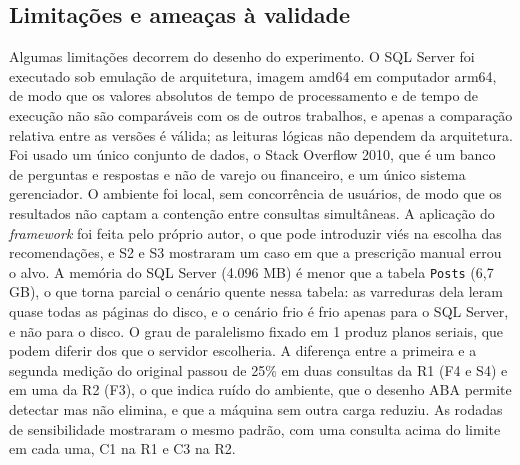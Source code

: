 \subsection{Limitações e ameaças à validade}\label{sec:limitacoes}

Algumas limitações decorrem do desenho do experimento. O SQL Server foi executado sob emulação de arquitetura, imagem amd64 em computador arm64, de modo que os valores absolutos de tempo de processamento e de tempo de execução não são comparáveis com os de outros trabalhos, e apenas a comparação relativa entre as versões é válida; as leituras lógicas não dependem da arquitetura. Foi usado um único conjunto de dados, o Stack Overflow 2010, que é um banco de perguntas e respostas e não de varejo ou financeiro, e um único sistema gerenciador. O ambiente foi local, sem concorrência de usuários, de modo que os resultados não captam a contenção entre consultas simultâneas. A aplicação do \textit{framework} foi feita pelo próprio autor, o que pode introduzir viés na escolha das recomendações, e S2 e S3 mostraram um caso em que a prescrição manual errou o alvo. A memória do SQL Server (4.096 MB) é menor que a tabela \texttt{Posts} (6,7 GB), o que torna parcial o cenário quente nessa tabela: as varreduras dela leram quase todas as páginas do disco, e o cenário frio é frio apenas para o SQL Server, e não para o disco. O grau de paralelismo fixado em 1 produz planos seriais, que podem diferir dos que o servidor escolheria. A diferença entre a primeira e a segunda medição do original passou de 25\% em duas consultas da R1 (F4 e S4) e em uma da R2 (F3), o que indica ruído do ambiente, que o desenho ABA permite detectar mas não elimina, e que a máquina sem outra carga reduziu. As rodadas de sensibilidade mostraram o mesmo padrão, com uma consulta acima do limite em cada uma, C1 na R1 e C3 na R2.
